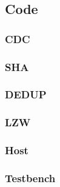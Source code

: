 \documentclass[../main.tex]{subfiles}
\begin{document}
\subsection{Code}

\subsubsection{CDC}

\vspace{0.5cm}

\subsubsection{SHA}

\vspace{0.5cm}

\subsubsection{DEDUP}

\vspace{0.5cm}

\subsubsection{LZW}

\vspace{0.5cm}

\subsubsection{Host}

\vspace{0.5cm}

\subsubsection{Testbench}

\end{document}
